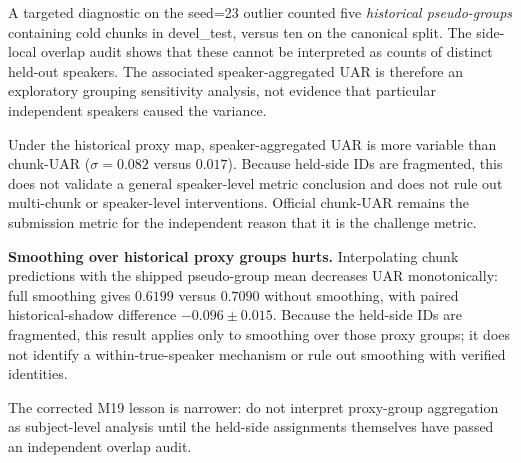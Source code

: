 A targeted diagnostic on the seed=23 outlier counted five \emph{historical pseudo-groups} containing cold chunks in devel\_test, versus ten on the canonical split. The side-local overlap audit shows that these cannot be interpreted as counts of distinct held-out speakers. The associated speaker-aggregated UAR is therefore an exploratory grouping sensitivity analysis, not evidence that particular independent speakers caused the variance.

Under the historical proxy map, speaker-aggregated UAR is more variable than chunk-UAR ($\sigma=0.082$ versus $0.017$). Because held-side IDs are fragmented, this does not validate a general speaker-level metric conclusion and does not rule out multi-chunk or speaker-level interventions. Official chunk-UAR remains the submission metric for the independent reason that it is the challenge metric.

\textbf{Smoothing over historical proxy groups hurts.} Interpolating chunk predictions with the shipped pseudo-group mean decreases UAR monotonically: full smoothing gives $0.6199$ versus $0.7090$ without smoothing, with paired historical-shadow difference $-0.096 \pm 0.015$. Because the held-side IDs are fragmented, this result applies only to smoothing over those proxy groups; it does not identify a within-true-speaker mechanism or rule out smoothing with verified identities.

The corrected M19 lesson is narrower: do not interpret proxy-group aggregation as subject-level analysis until the held-side assignments themselves have passed an independent overlap audit.
